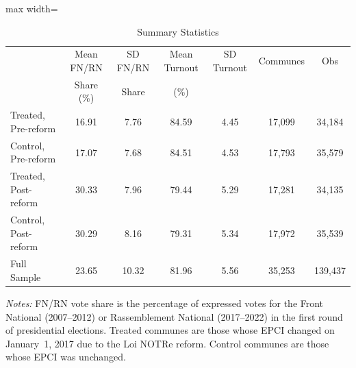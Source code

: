 \begin{table}[H]
\centering
\caption{Summary Statistics}
\label{tab:summary}
\begin{adjustbox}{max width=\textwidth}
\begin{tabular}{lcccccc}
\toprule
 & Mean FN/RN & SD FN/RN & Mean Turnout & SD Turnout & Communes & Obs \\
 & Share (\%) & Share & (\%) & & & \\
\midrule
Treated, Pre-reform & 16.91 & 7.76 & 84.59 & 4.45 & 17,099 & 34,184 \\
Control, Pre-reform & 17.07 & 7.68 & 84.51 & 4.53 & 17,793 & 35,579 \\
Treated, Post-reform & 30.33 & 7.96 & 79.44 & 5.29 & 17,281 & 34,135 \\
Control, Post-reform & 30.29 & 8.16 & 79.31 & 5.34 & 17,972 & 35,539 \\
\midrule
Full Sample & 23.65 & 10.32 & 81.96 & 5.56 & 35,253 & 139,437 \\
\bottomrule
\end{tabular}
\end{adjustbox}
\par\vspace{0.3em}
{\small \textit{Notes:} FN/RN vote share is the percentage of expressed votes for the Front National (2007--2012) or Rassemblement National (2017--2022) in the first round of presidential elections. Treated communes are those whose EPCI changed on January~1, 2017 due to the Loi NOTRe reform. Control communes are those whose EPCI was unchanged.}
\end{table}
